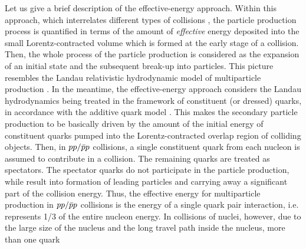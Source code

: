 \documentclass[twocolumn,showpacs,preprintnumbers,prd,superscriptaddress,nofootinbib]{revtex4}
\begin{document}
 Let us give a brief description of  the effective-energy approach.
 Within this approach, 
 which    
 interrelates different types of collisions ,
 the particle production process 
is quantified
 in 
 terms of the 
amount of {\it effective} energy
deposited 
into the small
 Lorentz-contracted volume 
 which is 
formed at the early stage of a 
collision.
  Then, the
 whole process of  the particle production
  is 
 considered
  as the expansion of an initial state 
  and the subsequent break-up into particles.  
This 
 picture
  resembles 
the Landau
 relativistic
 hydrodynamic model
 of 
 multiparticle production 
 .
 In the meantime, the effective-energy approach 
 considers 
the Landau 
hydrodynamics 
 being
 treated 
 in the framework of constituent (or dressed) quarks, in 
 accordance with the additive quark model .
 This makes the secondary particle  production 
to be  basically driven by  the amount of the 
 initial 
 energy 
 of 
 constituent quarks 
 pumped into the Lorentz-contracted 
 overlap 
 region
 of colliding objects.
 Then, in $pp/{\bar p}p$ collisions, a single constituent quark from  
 each nucleon is 
 assumed
  to   contribute
 in a collision.
 The remaining quarks
 are treated as spectators. 
  The spectator quarks 
 do not participate in the 
 particle 
 production, while 
 result
   into 
 formation of leading particles 
  and 
 carrying away a  significant part of the collision energy.
  Thus, 
  the effective energy for
  multiparticle production in  $pp/{\bar p}p$ collisions is the energy of 
  a single quark pair   interaction,
  i.e. represents 1/3 of the entire nucleon energy.
 In collisions of nuclei, however, due to the large size of the 
nucleus and the long travel path inside the nucleus, more than one quark 
\end{document}
